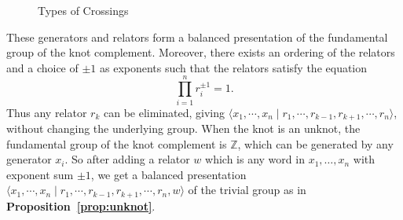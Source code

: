 \begin{figure}
    \centering
{}
    \caption{Types of Crossings}
    \label{fig:wp}
\end{figure}
These generators and relators form a balanced presentation of the fundamental group of the knot complement. Moreover, there exists an ordering of the relators and a choice of $\pm 1$ as exponents such that the relators satisfy the equation
$$\prod_{i=1}^nr_i^{\pm1}=1.
$$
Thus any relator $r_k$ can be eliminated, giving $\langle x_1,\cdots,x_n\mid r_1,\cdots,r_{k-1},r_{k+1},\cdots,r_n\rangle$, without changing the underlying group. When the knot is an unknot, the fundamental group of the knot complement is $\mathbb{Z}$, which can be generated by any generator $x_i$. So after adding a relator $w$ which is any word in $x_1,\ldots,x_n$ with exponent sum $\pm1$, we get a balanced presentation $\langle x_1,\cdots,x_n\mid r_1,\cdots,r_{k-1},r_{k+1},\cdots,r_n,w\rangle$ of the trivial group as in \textbf{Proposition~\ref{prop:unknot}}. 

